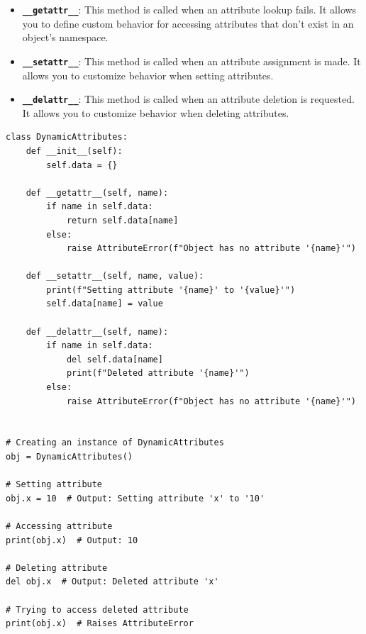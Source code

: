 \begin{itemize}
    \item \textbf{\texttt{\_\_getattr\_\_}}: This method is called when an attribute lookup fails. It allows you to define custom behavior for accessing attributes that don't exist in an object's namespace.
    
    \item \textbf{\texttt{\_\_setattr\_\_}}: This method is called when an attribute assignment is made. It allows you to customize behavior when setting attributes.
    
    \item \textbf{\texttt{\_\_delattr\_\_}}: This method is called when an attribute deletion is requested. It allows you to customize behavior when deleting attributes.
\end{itemize}

\begin{codebox}
\begin{verbatim}
class DynamicAttributes:
    def __init__(self):
        self.data = {}

    def __getattr__(self, name):
        if name in self.data:
            return self.data[name]
        else:
            raise AttributeError(f"Object has no attribute '{name}'")

    def __setattr__(self, name, value):
        print(f"Setting attribute '{name}' to '{value}'")
        self.data[name] = value

    def __delattr__(self, name):
        if name in self.data:
            del self.data[name]
            print(f"Deleted attribute '{name}'")
        else:
            raise AttributeError(f"Object has no attribute '{name}'")


# Creating an instance of DynamicAttributes
obj = DynamicAttributes()

# Setting attribute
obj.x = 10  # Output: Setting attribute 'x' to '10'

# Accessing attribute
print(obj.x)  # Output: 10

# Deleting attribute
del obj.x  # Output: Deleted attribute 'x'

# Trying to access deleted attribute
print(obj.x)  # Raises AttributeError
\end{verbatim}
\end{codebox}


